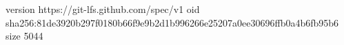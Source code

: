 version https://git-lfs.github.com/spec/v1
oid sha256:81de3920b297f0180b66f9e9b2d1b996266e25207a0ee30696ffb0a4b6fb95b6
size 5044
